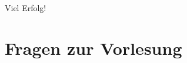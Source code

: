 \documentclass[11pt,a4paper,addpoints]{exam}
\begin{document}
	
	\vspace{1cm}
	
	\begin{center}
	\Large Viel Erfolg!
	\end{center}
	
	\vspace{1.5cm}


\vspace{1.5cm}


\vspace{1.5cm}

\newpage
\section{Fragen zur Vorlesung}
\end{document}
